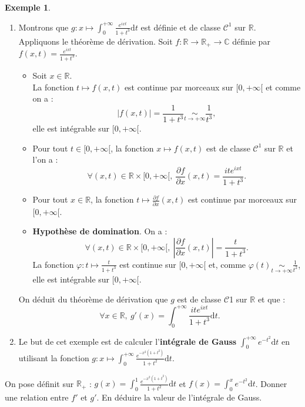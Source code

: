 \documentclass[french]{article}
\newcommand{\R}{\mathbb{R}}
\newcommand{\C}{\mathbb{C}}
\renewcommand{\d}{\text{d}}
\theoremstyle{plain}
\theoremstyle{definition}
\newtheorem*{ex}{Exemple}
\theoremstyle{remark}
\begin{document}
\begin{ex}
	\begin{enumerate}
		\item Montrons que $g:x\mapsto\displaystyle\int_{0}^{+\infty}\frac{e^{ixt}}{1+t^3}\d t$ est définie et de classe $\mathcal{C}^1$ sur $\R$. \\
		Appliquons le théorème de dérivation. Soit $f:\R\to\R_+\to\C$ définie par $f(x,t)=\displaystyle\frac{e^{ixt}}{1+t^3}$.
		\begin{itemize}
			\item Soit $x\in\R$.\\
			La fonction $t\mapsto f(x,t)$ est continue par morceaux sur $[0,+\infty[$ et comme on a :
			$$\lvert f(x,t)\rvert=\frac{1}{1+t^3}\underset{t\to+\infty}{\sim}\frac{1}{t^3},$$
			elle est intégrable sur $[0,+\infty[$.
			\item Pour tout $t\in[0,+\infty[$, la fonction $x\mapsto f(x,t)$ est de classe $\mathcal{C}^1$ sur $\R$ et l'on a :
			$$\forall (x,t)\in\R\times[0,+\infty[,\ \frac{\partial f}{\partial x}(x,t)=\frac{ite^{ixt}}{1+t^3}.$$
			\item Pour tout $x\in\R$, la fonction $t\mapsto\displaystyle\frac{\partial f}{\partial x}(x,t)$ est continue par morceaux sur $[0,+\infty[$.
			\item \textbf{Hypothèse de domination}. On a :
			$$\forall (x,t)\in\R\times[0,+\infty[,\ \left\lvert\frac{\partial f}{\partial x}(x,t)\right\rvert=\frac{t}{1+t^3}.$$
			La fonction $\varphi:t\mapsto\displaystyle\frac{t}{1+t^3}$ est continue sur $[0,+\infty[$ et, comme $\varphi(t)\underset{t\to+\infty}{\sim}\frac{1}{t^2}$, elle est intégrable sur $[0,+\infty[$.
		\end{itemize}
		On déduit du théorème de dérivation que $g$ est de classe $\mathcal{C}$1 sur $\R$ et que :
		$$\forall x\in\R,\ g'(x)=\int_{0}^{+\infty}\frac{ite^{ixt}}{1+t^3}\d t.$$
		\item Le but de cet exemple est de calculer l'\textbf{intégrale de Gauss} $\displaystyle\int_{0}^{+\infty}e^{-t^2}\d t$ en utilisant la fonction $g:x\mapsto\displaystyle\int_{0}^{+\infty}\frac{e^{-x^2(1+t^2)}}{1+t^2}\d t$.
	\end{enumerate}
\end{ex}

\begin{exo}
	On pose définit sur $\R_+$ : $g(x)=\displaystyle\int_{0}^{1}\frac{e^{-x^2(1+t^2)}}{1+t^2}\d t$ et $f(x)=\displaystyle\int_{0}^{x}e^{-t^2}\d t$. Donner une relation entre $f'$ et $g'$. En déduire la valeur de l'intégrale de Gauss.
\end{exo}
\end{document}

